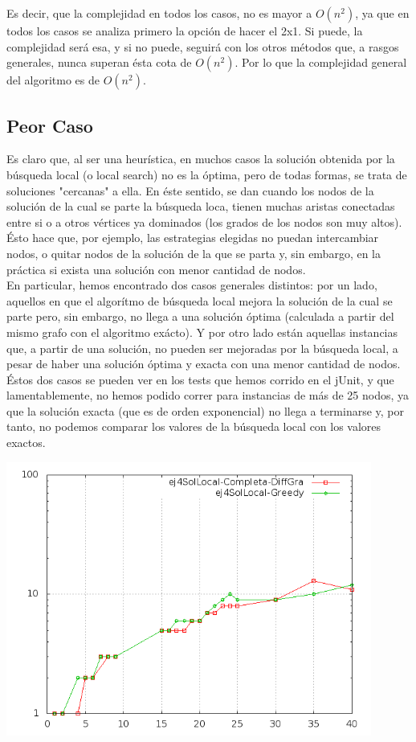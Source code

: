  Es decir, que la complejidad en todos los casos, no es mayor a $O(n^2)$, ya que en todos los casos se analiza primero la opción de hacer el 2x1. Si puede, la complejidad será esa, y si no puede, seguirá con los otros métodos que, a rasgos generales, nunca superan ésta cota de $O(n^2)$. Por lo que la complejidad general del algoritmo es de \textbf{$O(n^2)$}.
 
 \subsection{Peor Caso}
 Es claro que, al ser una heurística, en muchos casos la solución obtenida por la búsqueda local (o local search) no es la óptima, pero de todas formas, se trata de soluciones "cercanas" a ella. En éste sentido, se dan cuando los nodos de la solución de la cual se parte la búsqueda loca, tienen muchas aristas conectadas entre si o a otros vértices ya dominados (los grados de los nodos son muy altos). Ésto hace que, por ejemplo, las estrategias elegidas no puedan intercambiar nodos, o quitar nodos de la solución de la que se parta y, sin embargo, en la práctica si exista una solución con menor cantidad de nodos. \\
En particular, hemos encontrado dos casos generales distintos: por un lado, aquellos en que el algorítmo de búsqueda local mejora la solución de la cual se parte pero, sin embargo, no llega a una solución óptima (calculada a partir del mismo grafo con el algoritmo exácto). Y por otro lado están aquellas instancias que, a partir de una solución, no pueden ser mejoradas por la búsqueda local, a pesar de haber una solución óptima y exacta con una menor cantidad de nodos. Éstos dos casos se pueden ver en los tests que hemos corrido en el jUnit, y que lamentablemente, no hemos podido correr para instancias de más de 25 nodos, ya que la solución exacta (que es de orden exponencial) no llega a terminarse y, por tanto, no podemos comparar los valores de la búsqueda local con los valores exactos. \\
\begin{center}
\includegraphics[width=12cm]{./graficos/comparacionSolucionPasadaLocal.png}
\end{center}
